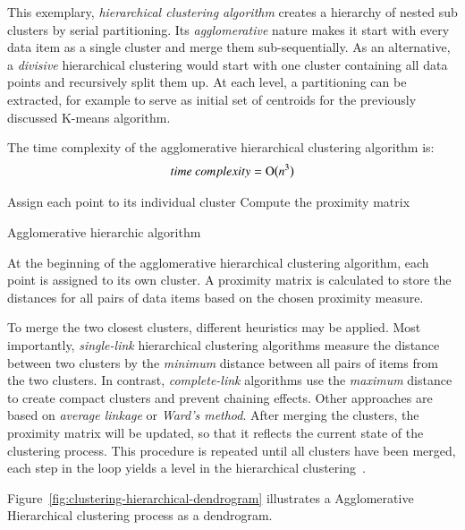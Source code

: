 This exemplary, \textit{hierarchical clustering algorithm} creates a hierarchy of nested sub clusters by serial partitioning. Its \textit{agglomerative} nature makes it start with every data item as a single cluster and merge them sub-sequentially. As an alternative, a \textit{divisive} hierarchical clustering would start with one cluster containing all data points and recursively split them up. At each level, a partitioning can be extracted, for example to serve as initial set of centroids for the previously discussed K-means algorithm. 

The time complexity of the agglomerative hierarchical clustering algorithm is:
\[time~complexity = \operatorname{O}\bigl(n^3\bigr)\]

\begin{algorithm}[t]
  {Assign each point to its individual cluster}\;
  {Compute the proximity matrix}\;
  \caption{Agglomerative hierarchic algorithm~\cite{Meert06clustermaps}}
  \label{alg:hierarchical}
\end{algorithm}

At the beginning of the agglomerative hierarchical clustering algorithm, each point is assigned to its own cluster. A proximity matrix is calculated to store the distances for all pairs of data items based on the chosen proximity measure.

To merge the two closest clusters, different heuristics may be applied. Most importantly, \textit{single-link} hierarchical clustering algorithms measure the distance between two clusters by the \textit{minimum} distance between all pairs of items from the two clusters. In contrast, \textit{complete-link} algorithms use the \textit{maximum} distance to create compact clusters and prevent chaining effects. Other approaches are based on \textit{average linkage} or \textit{Ward's method}. After merging the clusters, the proximity matrix will be updated, so that it reflects the current state of the clustering process. This procedure is repeated until all clusters have been merged, each step in the loop yields a level in the hierarchical clustering~\cite{Jain88clustering, Jain99clusterreview, Meert06clustermaps}.

Figure~\ref{fig:clustering-hierarchical-dendrogram} illustrates a Agglomerative Hierarchical clustering process as a dendrogram.

